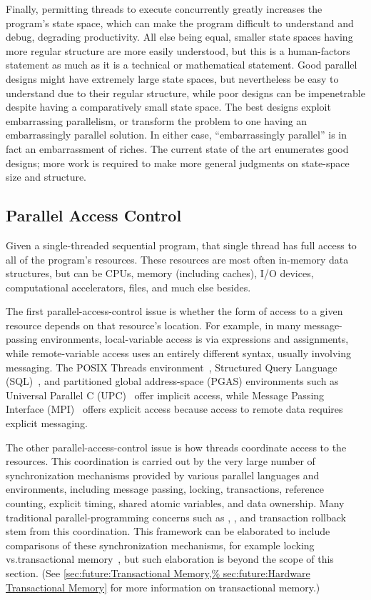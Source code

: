 Finally, permitting threads to execute concurrently greatly increases
the program's state space, which can make the program difficult to
understand and debug, degrading productivity.
All else being equal, smaller state spaces having more regular structure
are more easily understood, but this is a human-factors statement as much
as it is a technical or mathematical statement.
Good parallel designs might have extremely large state spaces, but
nevertheless be easy to understand due to their regular structure,
while poor designs can be impenetrable despite having a comparatively
small state space.
The best designs exploit embarrassing parallelism, or transform the
problem to one having an embarrassingly parallel solution.
In either case, ``embarrassingly parallel'' is in fact
an embarrassment of riches.
The current state of the art enumerates good designs; more work is
required to make more general judgments on
state-space size and structure.

\subsection{Parallel Access Control}
\label{sec:Parallel Access Control}

Given a single-threaded sequential program, that single
thread has full access to all of the program's resources.
These resources are most often in-memory data structures, but can be CPUs,
memory (including caches), I/O devices, computational accelerators, files,
and much else besides.

The first parallel-access-control issue is whether the form of access to
a given resource depends on that resource's location.
For example, in many message-passing environments, local-variable
access is via expressions and assignments,
while remote-variable access uses an entirely different
syntax, usually involving messaging.
The POSIX Threads environment~\cite{OpenGroup1997pthreads},
Structured Query Language (SQL)~\cite{DIS9075SQL92}, and
partitioned global address-space (PGAS) environments
such as Universal Parallel C (UPC)~\cite{ElGhazawi2003UPC,UPCConsortium2013}
offer implicit access,
while Message Passing Interface (MPI)~\cite{MPIForum2008} offers
explicit access because access to remote data requires explicit
messaging.

The other parallel-access-control issue is how threads coordinate
access to the resources.
This coordination is carried out by
the very large number of synchronization mechanisms
provided by various parallel languages and environments,
including message passing, locking, transactions,
reference counting, explicit timing, shared atomic variables, and data
ownership.
Many traditional parallel-programming concerns such as ,
, and transaction rollback stem from this coordination.
This framework can be elaborated to include comparisons
of these synchronization mechanisms, for example locking vs.\@ transactional
memory~\cite{McKenney2007PLOSTM}, but such elaboration is beyond the
scope of this section.
(See
\cref{sec:future:Transactional Memory,%
sec:future:Hardware Transactional Memory}
for more information on transactional memory.)

